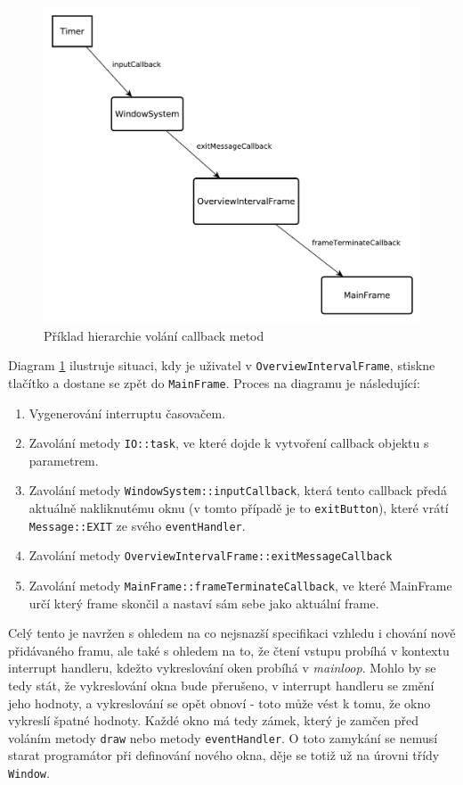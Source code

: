 \begin{figure}[tbh!]\centering
\includegraphics[scale=0.6]{../diagrams/stm_callback_metody.pdf}
\caption{Příklad hierarchie volání callback metod}
\label{fig:stm-callback-metody}
\end{figure}

Diagram \ref{fig:stm-callback-metody} ilustruje situaci, kdy je uživatel v \texttt{OverviewIntervalFrame}, stiskne
tlačítko  a dostane se zpět do \texttt{MainFrame}.
Proces na diagramu je následující:
\begin{enumerate}
  \item Vygenerování interruptu časovačem.
  \item Zavolání metody \texttt{IO::task}, ve které dojde k vytvoření callback objektu s parametrem.
  \item Zavolání metody \texttt{WindowSystem::inputCallback}, která tento callback pře\-dá aktuálně
    nakliknutému oknu (v tomto případě je to \texttt{exitButton}), které vrátí \texttt{Message::EXIT}
    ze svého \texttt{eventHandler}.
  \item Zavolání metody \texttt{OverviewIntervalFrame::exitMessageCallback}
  \item Zavolání metody \texttt{MainFrame::frameTerminateCallback}, ve které MainFrame určí který
    frame skončil a nastaví sám sebe jako aktuální frame.
\end{enumerate}

Celý tento  je navržen s ohledem na co nejsnazší specifikaci vzhledu i chování nově přidávaného
framu, ale také s ohledem na to, že čtení vstupu probíhá v kontextu interrupt handleru, kdežto vykreslování
oken probíhá v \emph{mainloop}.
Mohlo by se tedy stát, že vykreslování okna bude přerušeno, v interrupt handleru se změní jeho hodnoty,
a vykreslování se opět obnoví - toto může vést k tomu, že okno vykreslí špatné hodnoty.
Každé okno má tedy zámek, který je zamčen před voláním metody \texttt{draw} nebo metody \texttt{eventHandler}.
O toto zamykání se nemusí starat programátor při definování nového okna, děje se totiž už na úrovni
třídy \texttt{Window}.


